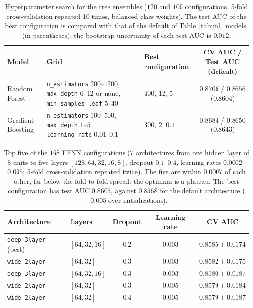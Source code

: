 \begin{table}[t]
\centering
\begin{tabular}{lp{7cm}lc}
\toprule
Model & Grid & Best configuration & CV AUC / Test AUC (default) \\
\midrule
Random Forest & \texttt{n\_estimators} $200$--$1200$, \texttt{max\_depth} $6$--$12$ or none, \texttt{min\_samples\_leaf} $5$--$40$ & $400$, $12$, $5$ & $0.8706$ / $0.8656$ ($0.8604$) \\
Gradient Boosting & \texttt{n\_estimators} $100$--$500$, \texttt{max\_depth} $1$--$5$, \texttt{learning\_rate} $0.01$--$0.1$ & $300$, $2$, $0.1$ & $0.8684$ / $0.8650$ ($0.8643$) \\
\bottomrule
\end{tabular}
\caption{Hyperparameter search for the tree ensembles ($120$ and $100$ configurations, 5-fold cross-validation repeated 10 times, balanced class weights). The test AUC of the best configuration is compared with that of the default of Table~\ref{tab:ml_models} (in parentheses); the bootstrap uncertainty of each test AUC is $0.012$.}
\label{tab:ml_hyperparams}
\end{table}
\begin{table}[t]
\centering
\begin{tabular}{llccc}
\toprule
Architecture & Layers & Dropout & Learning rate & CV AUC \\
\midrule
\texttt{deep\_3layer} (best) & $[64,32,16]$ & $0.2$ & $0.003$ & $0.8585\pm0.0174$ \\
\texttt{wide\_2layer}        & $[64,32]$    & $0.3$ & $0.003$ & $0.8582\pm0.0175$ \\
\texttt{deep\_3layer}        & $[64,32,16]$ & $0.3$ & $0.003$ & $0.8580\pm0.0187$ \\
\texttt{wide\_2layer}        & $[64,32]$    & $0.3$ & $0.005$ & $0.8579\pm0.0184$ \\
\texttt{wide\_2layer}        & $[64,32]$    & $0.4$ & $0.005$ & $0.8579\pm0.0187$ \\
\bottomrule
\end{tabular}
\caption{Top five of the $168$ FFNN configurations ($7$ architectures from one hidden layer of 8 units to five layers $[128,64,32,16,8]$, dropout $0.1$--$0.4$, learning rates $0.0002$--$0.005$; 5-fold cross-validation repeated twice). The five are within $0.0007$ of each other, far below the fold-to-fold spread: the optimum is a plateau. The best configuration has test AUC $0.8606$, against $0.8568$ for the default architecture ($\pm0.005$ over initializations).}
\label{tab:ml_ffnn_search}
\end{table}

